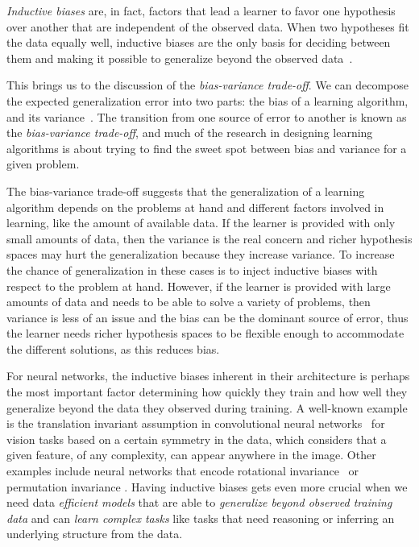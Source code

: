 \emph{Inductive biases} are, in fact, factors that lead a learner to favor one hypothesis over another that are independent of the observed data. When two hypotheses fit the data equally well, inductive biases are the only basis for deciding between them and making it possible to generalize beyond the observed data~\citep{Mitchell80theneed}.

This brings us to the discussion of the \emph{bias-variance trade-off}.
We can decompose the expected generalization error into two parts: the
bias of a learning algorithm, and its variance~\citep{geman1992neural}. The transition from one source of error to another is known as the \emph{bias-variance trade-off}, and much of the research in designing learning algorithms is about trying to find the sweet spot between bias and variance for a given problem. 

The bias-variance trade-off suggests that the generalization of a learning algorithm depends on the problems at hand and different factors involved in learning, like the amount of available data. 
If the learner is provided with only small amounts of data, then the variance is the real concern and richer hypothesis spaces may hurt the generalization because they increase variance.  To increase the chance of generalization in these cases is to inject inductive biases with respect to the problem at hand.
However, if the learner is provided with large amounts of data and needs to be able to solve a variety of problems, then variance is less of an issue and the bias can be the dominant source of error, thus the learner needs richer hypothesis spaces to be flexible enough to accommodate the different solutions, as this reduces bias.

For neural networks, the inductive biases inherent in their architecture is perhaps the most important factor determining how quickly they train and how well they generalize beyond the data they observed during training. 
A well-known example is the translation invariant assumption in convolutional neural networks~\citep{lecun1989backpropagation} for vision tasks based on a certain symmetry in the data, which considers that a given feature, of any complexity, can appear anywhere in the image.   Other examples include neural networks that encode rotational invariance~\citep{cohen2016steerable} or permutation invariance \citep{zaheer2017deep, lee2018set}.
Having inductive biases gets even more crucial when we need data \emph{efficient models} that are able to \emph{generalize beyond observed training data} and can \emph{learn complex tasks} like tasks that need reasoning or inferring an underlying structure from the data.

